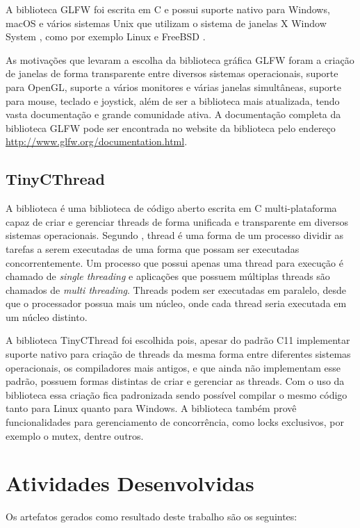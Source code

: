 \documentclass[12pt, %
openright,
oneside, %
a4paper,    %
brazil]{facom-ufu-abntex2}
\begin{document}
A biblioteca GLFW foi escrita em C e possui suporte nativo para Windows, macOS e vários sistemas Unix \cite{Unix:About} que utilizam o sistema de janelas X Window System \cite{X:About}, como por exemplo Linux \cite{Linux:About} e FreeBSD \cite{FreeBSD:About}.

As motivações que levaram a escolha da biblioteca gráfica GLFW foram a criação de janelas de forma transparente entre diversos sistemas operacionais, suporte para OpenGL, suporte a vários monitores e várias janelas simultâneas, suporte para mouse, teclado e joystick, além de ser a biblioteca mais atualizada, tendo vasta documentação e grande comunidade ativa. A documentação completa da biblioteca GLFW pode ser encontrada no website da biblioteca pelo endereço \hyperref[http://www.glfw.org/documentation.html]{http://www.glfw.org/documentation.html}.

\subsection{TinyCThread}
A biblioteca  é uma biblioteca de código aberto escrita em C multi-plataforma capaz de criar e gerenciar threads de forma unificada e transparente em diversos sistemas operacionais. Segundo , thread é uma forma de um processo dividir as tarefas a serem executadas de uma forma que possam ser executadas concorrentemente. Um processo que possui apenas uma thread para execução é chamado de \textit{single threading} e aplicações que possuem múltiplas threads são chamados de \textit{multi threading}. Threads podem ser executadas em paralelo, desde que o processador possua mais um núcleo, onde cada thread seria executada em um núcleo distinto.

A biblioteca TinyCThread foi escolhida pois, apesar do padrão C11 implementar suporte nativo para criação de threads da mesma forma entre diferentes sistemas operacionais, os compiladores mais antigos, e que ainda não implementam esse padrão, possuem formas distintas de criar e gerenciar as threads. Com o uso da biblioteca essa criação fica padronizada sendo possível compilar o mesmo código tanto para Linux quanto para Windows. A biblioteca também provê funcionalidades para gerenciamento de concorrência, como locks exclusivos, por exemplo o mutex, dentre outros.

\section{Atividades Desenvolvidas}
Os artefatos gerados como resultado deste trabalho são os seguintes:
\end{document}
